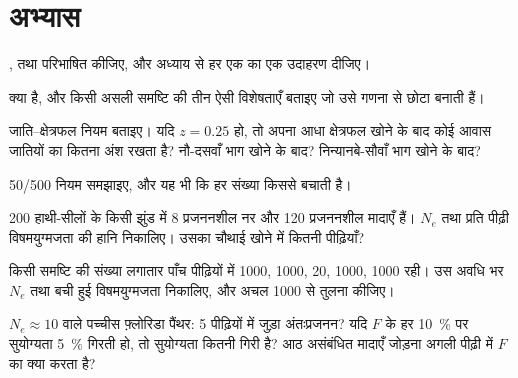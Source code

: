 \section{अभ्यास}

\begin{exercise}[$\star$]\label{exo:b3:conservation-biology:1}
,  तथा 
परिभाषित कीजिए, और अध्याय से हर एक का एक उदाहरण दीजिए।
\end{exercise}

\begin{exercise}[$\star$]\label{exo:b3:conservation-biology:2}
 क्या है, और किसी असली समष्टि की तीन ऐसी विशेषताएँ
बताइए जो उसे गणना से छोटा बनाती हैं।
\end{exercise}

\begin{exercise}[$\star$]\label{exo:b3:conservation-biology:3}
जाति--क्षेत्रफल नियम बताइए। यदि $z = 0.25$ हो, तो अपना आधा क्षेत्रफल
खोने के बाद कोई आवास जातियों का कितना अंश रखता है? नौ-दसवाँ भाग खोने के
बाद? निन्यानबे-सौवाँ भाग खोने के बाद?
\end{exercise}

\begin{exercise}[$\star$]\label{exo:b3:conservation-biology:4}
50/500 नियम समझाइए, और यह भी कि हर संख्या किससे बचाती है।
\end{exercise}

\begin{exercise}[$\star\star$]\label{exo:b3:conservation-biology:5}
200 हाथी-सीलों के किसी झुंड में 8 प्रजननशील नर और 120 प्रजननशील मादाएँ
हैं। $N_{e}$ तथा प्रति पीढ़ी विषमयुग्मजता की हानि निकालिए। उसका चौथाई
खोने में कितनी पीढ़ियाँ?
\end{exercise}

\begin{exercise}[$\star\star$]\label{exo:b3:conservation-biology:6}
किसी समष्टि की संख्या लगातार पाँच पीढ़ियों में 1000, 1000, 20, 1000,
1000 रही। उस अवधि भर $N_{e}$ तथा बची हुई विषमयुग्मजता निकालिए, और अचल
1000 से तुलना कीजिए।
\end{exercise}

\begin{exercise}[$\star\star$]\label{exo:b3:conservation-biology:7}
$N_{e} \approx 10$ वाले पच्चीस फ़्लोरिडा पैंथर: 5 पीढ़ियों में जुड़ा
अंतःप्रजनन? यदि $F$ के हर \qty{10}{\%} पर सुयोग्यता \qty{5}{\%} गिरती हो,
तो सुयोग्यता कितनी गिरी है? आठ असंबंधित मादाएँ जोड़ना अगली पीढ़ी में $F$ का
क्या करता है?
\end{exercise}

